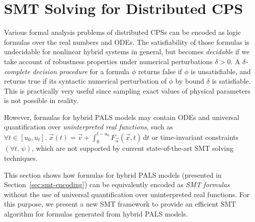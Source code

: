 

\section{SMT Solving for Distributed CPS}
\label{sec:smt-logic}

Various formal analysis problems of distributed CPSs 
can be encoded as logic formulas over the real numbers and ODEs.
%
The satisfiability of those formulas is undecidable for nonlinear hybrid systems  in general,
but becomes \emph{decidable} %
if we take account of robustness properties %
under numerical perturbations $\delta > 0$.
%
A \emph{$\delta$-complete decision procedure} for a formula $\phi$ returns false 
if $\phi$ is unsatisfiable, and returns true if its syntactic 
numerical perturbation of $\phi$ by bound $\delta$ is satisfiable. 
This is practically very useful since 
sampling exact values of physical parameters is not possible in reality. 

However, formulas for hybrid PALS models
may contain ODEs and universal quantification over \emph{uninterpreted real functions},
such as 
$\forall t \in [u_0,u_t].\;
\vec{x}(t) = \vec{v} + \int_0^{t-u_0} \!  F_{\vec{a}}(\vec{x},t)\,\mathrm{d}t$
or time-invariant constraints $(\forall t.\; \psi)$,
which are not supported by current state-of-the-art SMT solving techniques.


This section shows how formulas for hybrid PALS models (presented in Section~\ref{sec:smt-encoding})
can be equivalently encoded as \emph{SMT formulas}
without the use of universal quantification over uninterpreted real functions.
For this purpose, we present a new  SMT framework to provide 
an efficient SMT algorithm
for  formulas generated from hybrid PALS models.

